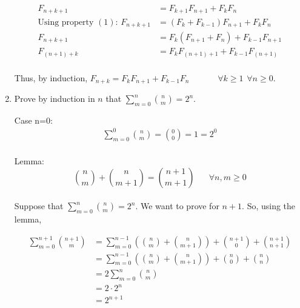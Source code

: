 \documentclass{article}
\begin{document}
\begin{enumerate}
  \begin{equation*}
    \begin{split}
        F_{n+k+1} & = F_{k+1}F_{n+1}+F_{k}F_{n} \\
        \text{Using property $(1)$: } F_{n+k+1} & = (F_{k}+F_{k-1})F_{n+1}+F_{k}F_{n} \\
        F_{n+k+1} & = F_{k}(F_{n+1}+F_{n}) + F_{k-1}F_{n+1}  \\
        F_{(n+1)+k} & = F_{k}F_{(n+1)+1} + F_{k-1}F_{(n+1)}  \\
    \end{split}
  \end{equation*}
  
  Thus, by induction, $F_{n+k}=F_{k}F_{n+1}+F_{k-1}F_{n} \hspace{40pt} \forall k\geq 1 \hspace{5pt} \forall n\geq 0$.
  \\
  
  \item Prove by induction in $n$ that \(\sum_{m=0}^{n}{n \choose m}=2^n\).
  
  Case n=0:
  \begin{equation*}
    \begin{split}
        \sum_{m=0}^{0}{n \choose m} = {0 \choose 0} = 1 = 2^0 \\
    \end{split}
  \end{equation*}
  
  Lemma: 
  \[ {n \choose m} + {n \choose m+1} = {n+1 \choose m+1}  \hspace{20pt} \forall n,m \geq 0 \]
  \\
  
  Suppose that \(\sum_{m=0}^{n}{n \choose m}=2^n\). We want to prove for $n+1$. So, using the lemma,
  
  \begin{equation*}
    \begin{split}
        \sum_{m=0}^{n+1}{n+1 \choose m} &= \sum_{m=0}^{n-1}({n \choose m} + {n \choose m+1}) + {n+1 \choose 0} + {n+1 \choose n+1} \\
        &= \sum_{m=0}^{n-1}({n \choose m} + {n \choose m+1}) + {n \choose 0} + {n \choose n} \\
        &= 2\sum_{m=0}^{n}{n \choose m} \\
        &= 2\cdot 2^n \\
        &= 2^{n+1}
    \end{split}
  \end{equation*}
  

\end{enumerate}
\end{document}
